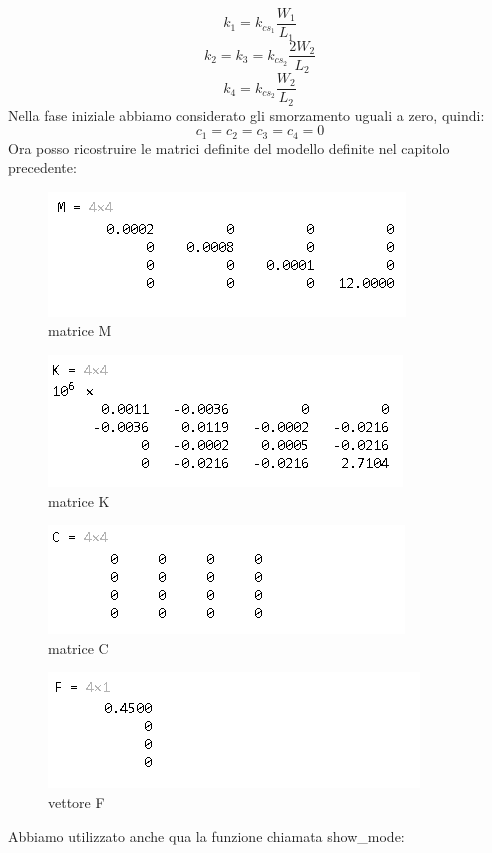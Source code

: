 \documentclass{article}
\begin{document}
\begin{equation*}
k_{1} = k_{cs_1}\frac{W_1}{L_1}
\end{equation*}
\begin{equation*}
k_{2} = k_{3} = k_{cs_2}\frac{2W_2}{L_2}
\end{equation*}
\begin{equation*}
k_{4} = k_{cs_2}\frac{W_2}{L_2}
\end{equation*}
Nella fase iniziale abbiamo considerato gli smorzamento uguali a zero, quindi:
\begin{equation*}
c_{1} = c_{2} = c_{3} = c_{4} = 0
\end{equation*}
Ora posso ricostruire le matrici definite del modello definite nel capitolo precedente:
\begin{figure}[H]
\centering
\includegraphics[width=.5\textwidth]{./assey/matrice_m.png}
\caption{matrice M}
\end{figure}
\begin{figure}[H]
\centering
\includegraphics[width=.5\textwidth]{./assey/matrice_k.png}
\caption{matrice K}
\end{figure}
\begin{figure}[H]
\centering
\includegraphics[width=.5\textwidth]{./assey/matrice_c.png}
\caption{matrice C}
\end{figure}
\begin{figure}[H]
\centering
\includegraphics[width=.5\textwidth]{./assey/vettore_f.png}
\caption{vettore F}
\end{figure}
Abbiamo utilizzato anche qua la funzione chiamata show\_mode:
\end{document}
